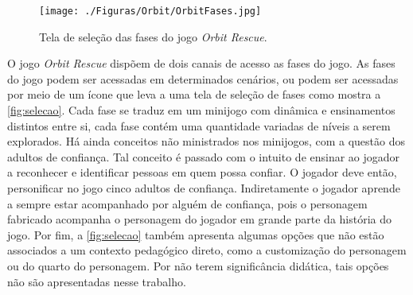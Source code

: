 
\vspace{-0.2cm}

\begin{figure}[htb]

	\caption{\label{fig:selecao}Tela de seleção das fases do jogo \textit{Orbit Rescue}.}
  \begin{center}\vspace{-0.3cm}
    \texttt{[image: ./Figuras/Orbit/OrbitFases.jpg]}
	\end{center}\vspace{-0.5cm}

\end{figure}

\vspace{-0.3cm}

O jogo \textit{Orbit Rescue} dispõem de dois canais de acesso as fases do jogo. 
As fases do jogo podem ser acessadas em determinados cenários, ou podem ser acessadas por meio de um ícone que leva a uma tela de seleção de fases como mostra a \autoref{fig:selecao}. Cada fase se traduz em um minijogo com dinâmica e ensinamentos distintos entre si, cada fase contém uma quantidade variadas de níveis a serem explorados. Há ainda conceitos não ministrados nos minijogos, com a questão dos adultos de confiança. Tal conceito é passado com o intuito de ensinar ao jogador a reconhecer e identificar pessoas em quem possa confiar. O jogador deve então, personificar no jogo cinco adultos de confiança. Indiretamente o jogador aprende a sempre estar acompanhado por alguém de confiança, pois o personagem fabricado acompanha o personagem do jogador em grande parte da história do jogo. Por fim, a \autoref{fig:selecao} também apresenta algumas opções que não estão associados a um contexto pedagógico direto, como a customização do personagem ou do quarto do personagem. Por não terem significância didática, tais opções não são apresentadas nesse trabalho. 

